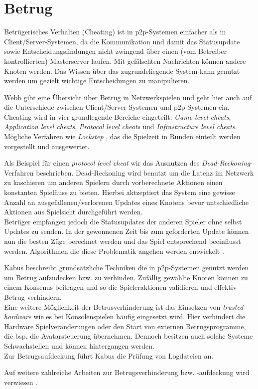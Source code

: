 \section{Betrug}
\label{chap:grundlagen:cheating}
Betrügerisches Verhalten (Cheating) ist in p2p-Systemen einfacher als in Client/Server-Systemen, da die Kommunikation und damit das Statusupdate sowie Entscheidungsfindungen nicht zwingend über einen (vom Betreiber kontrollierten) Masterserver laufen. Mit gefälschten Nachrichten können andere Knoten werden. Das Wissen über das zugrundeliegende System kann genutzt werden um gezielt wichtige Entscheidungen zu manipulieren.

Webb \cite{Webb2007Cheating} gibt eine Übersicht über Betrug in Netzwerkspielen und geht hier auch auf die Unterschiede zwischen Client/Server-Systemen und p2p-Systemen ein. Cheating wird in vier grundlegende Bereiche eingeteilt: \emph{Game level cheats}, \emph{Application level cheats}, \emph{Protocol level cheats} und \emph{Infrastructure level cheats}. Mögliche Verfahren wie \emph{Lockstep} \cite{Baughman2007}, das die Spielzeit in Runden einteilt werden vorgestellt und ausgewertet.

Als Beispiel für einen \emph{protocol level cheat} wir das Ausnutzen des \emph{Dead-Reckoning}-Verfahren \cite{Pantel2002} beschrieben. Dead-Reckoning wird benutzt um die Latenz im Netzwerk zu kaschieren um anderen Spielern durch vorberechnete Aktionen einen konstanten Spielfluss zu bieten. Hierbei aktzeptiert das System eine gewisse Anzahl an ausgefallenen/verlorenen Updates eines Knotens bevor untschiedliche Aktionen aus Spielsicht durchgeführt werden.\\
Betrüger empfangen jedoch die Statusupdates der anderen Spieler ohne selbst Updates zu senden. In der gewonnenen Zeit bis zum geforderten Update können nun die besten Züge berechnet werden und das Spiel entsprechend beeinflusst werden. Algorithmen die diese Problematik angehen werden entwickelt \cite{Aggarwal2005}.

Kabus \cite{Kabus2005Addressing} beschreibt grundsätzliche Techniken die in p2p-Systemen genutzt werden um Betrug aufzudecken bzw. zu verhinden. Zufällig gewählte Knoten können zu einem Konsenus beitragen und so die Spieleraktionen validieren und effektiv Betrug verhindern.\\
Eine weitere Möglichkeit der Betrusverhinderung ist das Einsetzen von \emph{trusted hardware} wie es bei Konsolenspielen häufig eingesetzt wird. Hier verhindert die Hardware Spielveränderungen oder den Start von externen Betrugsprogramme, die bsp. die Avatarsteuerung übernehmen. Dennoch besitzen auch solche Systeme Schwachstellen und können hintergangen werden.\\
Zur Betrugsaufdeckung führt Kabus die Prüfung von Logdateien an.

Auf weitere zahlreiche Arbeiten zur Betrugsverhinderung bzw. -aufdeckung wird verwiesen \cite{Ferretti2008Cheating, Gauthierdickey2004Low, Kabus2007Design}.
